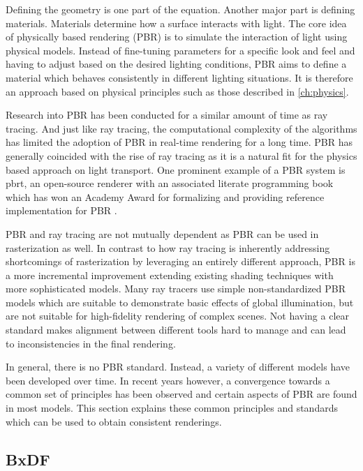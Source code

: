 Defining the geometry is one part of the equation. Another major part is defining materials. Materials determine how a surface interacts with light. The core idea of physically based rendering (\gls{PBR}) is to simulate the interaction of light using physical models. Instead of fine-tuning parameters for a specific look and feel and having to adjust based on the desired lighting conditions, \gls{PBR} aims to define a material which behaves consistently in different lighting situations. It is therefore an approach based on physical principles such as those described in \autoref{ch:physics}.

Research into \gls{PBR} has been conducted for a similar amount of time as ray tracing. And just like ray tracing, the computational complexity of the algorithms has limited the adoption of \gls{PBR} in real-time rendering for a long time. \gls{PBR} has generally coincided with the rise of ray tracing as it is a natural fit for the physics based approach on light transport. One prominent example of a \gls{PBR} system is \gls{pbrt}, an open-source renderer with an associated literate programming book which has won an Academy Award for formalizing and providing reference implementation for \gls{PBR} \cite{Pharr_Physically_Based_Rendering_2023}.

\gls{PBR} and ray tracing are not mutually dependent as \gls{PBR} can be used in rasterization as well. In contrast to how ray tracing is inherently addressing shortcomings of rasterization by leveraging an entirely different approach, \gls{PBR} is a more incremental improvement extending existing shading techniques with more sophisticated models. Many ray tracers use simple non-standardized \gls{PBR} models which are suitable to demonstrate basic effects of global illumination, but are not suitable for high-fidelity rendering of complex scenes. Not having a clear standard makes alignment between different tools hard to manage and can lead to inconsistencies in the final rendering.

In general, there is no \gls{PBR} standard. Instead, a variety of different models have been developed over time. In recent years however, a convergence towards a common set of principles has been observed and certain aspects of \gls{PBR} are found in most models. This section explains these common principles and standards which can be used to obtain consistent renderings.

\subsection*{BxDF}

